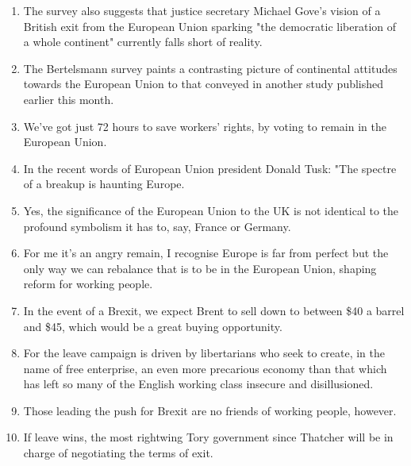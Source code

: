 \documentclass[fleqn,moreauthors,10pt]{ds_report}
\begin{document}
\begin{enumerate}
    \item The survey also suggests that justice secretary Michael Gove's vision of a British exit from the European Union sparking "the democratic liberation of a whole continent" currently falls short of reality.
    \item The Bertelsmann survey paints a contrasting picture of continental attitudes towards the European Union to that conveyed in another study published earlier this month.
    \item We've got just 72 hours to save workers' rights, by voting to remain in the	European Union.
    \item In the recent words of European Union president Donald Tusk: "The spectre of a breakup is haunting Europe.
    \item Yes, the significance of the European Union to the UK is not identical to the profound symbolism it has to, say, France or Germany.
    \item For me it's an angry remain, I recognise Europe is far from perfect but the only way we can rebalance that is to be in the European Union, shaping reform for working people.
    \item In the event of a Brexit, we expect Brent to sell down to between \$40 a barrel and \$45, which would be a great buying opportunity.
    \item For the leave campaign is driven by libertarians who seek to create, in the name of free enterprise, an even more precarious economy than that which has left so many of the English working class insecure and disillusioned.
    \item Those leading the push for Brexit are no friends of working people, however.
    \item If leave wins, the most rightwing Tory government since Thatcher will be in charge of negotiating the terms of exit.
\end{enumerate}
\end{document}
